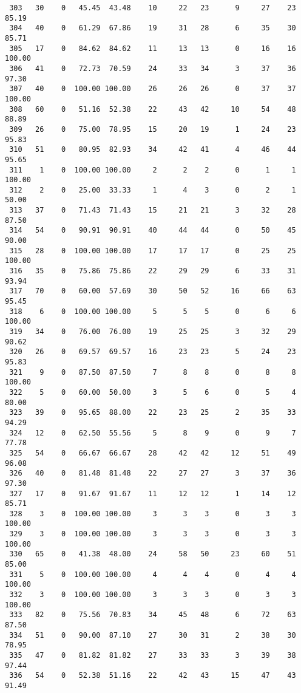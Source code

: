 \begin{verbatim}
 303   30    0   45.45  43.48    10     22   23      9     27    23    85.19
 304   40    0   61.29  67.86    19     31   28      6     35    30    85.71
 305   17    0   84.62  84.62    11     13   13      0     16    16   100.00
 306   41    0   72.73  70.59    24     33   34      3     37    36    97.30
 307   40    0  100.00 100.00    26     26   26      0     37    37   100.00
 308   60    0   51.16  52.38    22     43   42     10     54    48    88.89
 309   26    0   75.00  78.95    15     20   19      1     24    23    95.83
 310   51    0   80.95  82.93    34     42   41      4     46    44    95.65
 311    1    0  100.00 100.00     2      2    2      0      1     1   100.00
 312    2    0   25.00  33.33     1      4    3      0      2     1    50.00
 313   37    0   71.43  71.43    15     21   21      3     32    28    87.50
 314   54    0   90.91  90.91    40     44   44      0     50    45    90.00
 315   28    0  100.00 100.00    17     17   17      0     25    25   100.00
 316   35    0   75.86  75.86    22     29   29      6     33    31    93.94
 317   70    0   60.00  57.69    30     50   52     16     66    63    95.45
 318    6    0  100.00 100.00     5      5    5      0      6     6   100.00
 319   34    0   76.00  76.00    19     25   25      3     32    29    90.62
 320   26    0   69.57  69.57    16     23   23      5     24    23    95.83
 321    9    0   87.50  87.50     7      8    8      0      8     8   100.00
 322    5    0   60.00  50.00     3      5    6      0      5     4    80.00
 323   39    0   95.65  88.00    22     23   25      2     35    33    94.29
 324   12    0   62.50  55.56     5      8    9      0      9     7    77.78
 325   54    0   66.67  66.67    28     42   42     12     51    49    96.08
 326   40    0   81.48  81.48    22     27   27      3     37    36    97.30
 327   17    0   91.67  91.67    11     12   12      1     14    12    85.71
 328    3    0  100.00 100.00     3      3    3      0      3     3   100.00
 329    3    0  100.00 100.00     3      3    3      0      3     3   100.00
 330   65    0   41.38  48.00    24     58   50     23     60    51    85.00
 331    5    0  100.00 100.00     4      4    4      0      4     4   100.00
 332    3    0  100.00 100.00     3      3    3      0      3     3   100.00
 333   82    0   75.56  70.83    34     45   48      6     72    63    87.50
 334   51    0   90.00  87.10    27     30   31      2     38    30    78.95
 335   47    0   81.82  81.82    27     33   33      3     39    38    97.44
 336   54    0   52.38  51.16    22     42   43     15     47    43    91.49

\end{verbatim}
